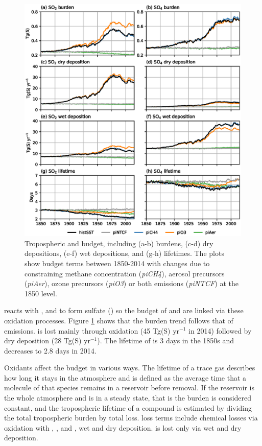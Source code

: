 \begin{figure}
    \centering
    \includegraphics[width=\linewidth]{Chapter3/Figs/f04_s-budget.eps}
    \caption[Tropospheric sulfur budget: burdens, depositions and lifetimes]{Tropospheric  and  budget, including (a-b) burdens, (c-d) dry depositions, (e-f) wet depositions, and (g-h) lifetimes. The plots show budget terms between 1850-2014 with changes due to constraining  methane concentration (\textit{piCH4}), aerosol precursors (\textit{piAer}), ozone precursors (\textit{piO3}) or both emissions (\textit{piNTCF}) at the 1850 level.}
    \label{fig:ch3:s-burden}
\end{figure}

 reacts with ,  and  to form sulfate () so the budget of  and  are linked via these oxidation processes. Figure \ref{fig:ch3:s-burden} shows that the  burden trend follows that of  emissions.  is lost mainly through oxidation (45 Tg(S) yr$^{-1}$ in 2014) followed by dry deposition (28 Tg(S) yr$^{-1}$). The lifetime of  is 3 days in the 1850s and decreases to 2.8 days in 2014. 

Oxidants affect the  budget in various ways. The lifetime of a trace gas describes how long it stays in the atmosphere and is defined as the average time that a molecule of that species remains in a reservoir before removal. If the reservoir is the whole atmosphere and is in a steady state, that is the burden is considered constant, and the tropospheric lifetime of a compound is estimated by dividing the total tropospheric burden by total loss.  loss terms include chemical losses via oxidation with , , and , wet and dry deposition.  is lost only via wet and dry deposition.

